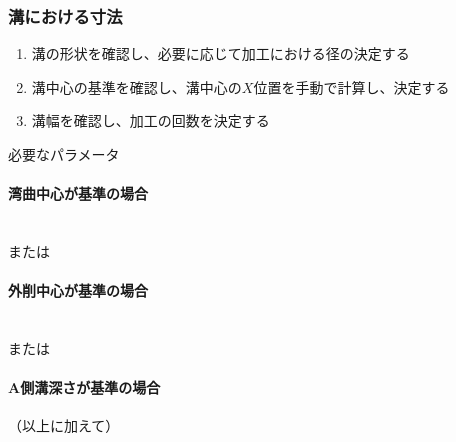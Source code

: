 \subsubsection{溝における寸法}
\begin{enumerate}
\item {}溝の形状を確認し、必要に応じて加工における径の決定する
\item {}溝中心の基準を確認し、溝中心の$X$位置を手動で計算し、決定する
\item {}溝幅を確認し、加工の回数を決定する
\end{enumerate}
\begin{Parameter}{必要なパラメータ}
\paragraph*{湾曲中心が基準の場合}
\\
または
\tcbline*
\paragraph*{外削中心が基準の場合}
\\
または
\tcbline*
\paragraph*{A側溝深さが基準の場合}
（以上に加えて）
\end{Parameter}

\clearpage
